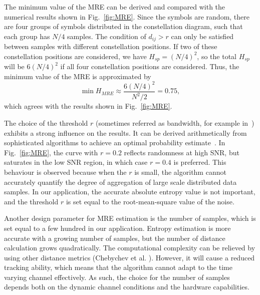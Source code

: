 \documentclass[12pt, draftclsnofoot, onecolumn]{IEEEtran}
\begin{document}
The minimum value of the MRE can be derived and compared with the numerical results shown in Fig.~\ref{fig:MRE}.
Since the symbols are random, there are four groups of symbols distributed in the constellation diagram, such that each group has \(N/4\) samples.
The condition of $d_{ij}>r$ can only be satisfied between samples with different constellation positions.
If two of these constellation positions are considered, we have $H_{sp} = (N/4)^2$, so the total $H_{sp}$ will be $6 (N/4)^2$ if all four constellation positions are considered.
Thus, the minimum value of the MRE is approximated by
\begin{equation}
\min{H_{MRE}} \approx \frac{ 6 \left(N/4\right)^2}{N^2/2}=0.75,
\label{eq:adEntQPSK}
\end{equation}
which agrees with the results shown in Fig.~\ref{fig:MRE}.




The choice of the threshold \(r\) (sometimes referred as bandwidth, for example in~\cite{Botev2010KernelDiffusion}) exhibits a strong influence on the results.
It can be derived arithmetically from sophisticated algorithms to achieve an optimal probability estimate~\cite{Botev2010KernelDiffusion}.
In Fig.~\ref{fig:MRE}, the curve with \(r=0.2\) reflects randomness at high SNR, but saturates in the low SNR region, in which case \(r=0.4\) is preferred.
This behaviour is observed because when the \(r\) is small, the algorithm cannot accurately quantify the degree of aggregation of large scale distributed data samples.
In our application, the accurate absolute entropy value is not important, and the threshold $r$ is set equal to the root-mean-square value of the noise.

Another design parameter for MRE estimation is the number of samples, which is set equal to a few hundred in our application.
Entropy estimation is more accurate with a growing number of samples, but the number of distance calculation grows quadratically.
The computational complexity can be relieved by 
using other distance metrics (Chebychev et al. \cite{Cha2007}).
However, it will cause a reduced tracking ability, which means that the algorithm cannot adapt to the time varying channel effectively.
As such, the choice for the number of samples depends both on the dynamic channel conditions and the hardware capabilities.
% 
% 
\end{document}
